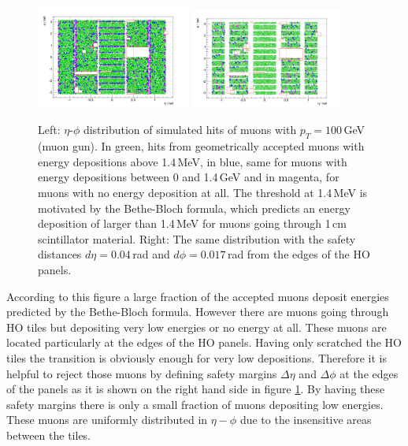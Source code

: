 			\begin{figure}[htbp]
				\centering
				\includegraphics[width=0.45\textwidth]{Figures/erdogan/simhits_wo_deta_dphi.png}
				\includegraphics[width=0.45\textwidth]{Figures/erdogan/simhits_with_deta_dphi.png}
				\caption{Left: $\eta$-$\phi$ distribution of simulated hits of muons with $p_T = 100$\,GeV (muon gun). In green, hits from geometrically accepted muons with energy depositions above 1.4\,MeV, in
				blue, same for muons with energy depositions between 0 and 1.4\,GeV and in magenta, for muons with no energy deposition at all. The threshold at 1.4\,MeV is motivated by the Bethe-Bloch formula,
				which predicts an energy deposition of larger than 1.4\,MeV for muons going through 1\,cm scintillator material. Right: The same distribution with the safety distances $d\eta = 0.04$\,rad and
				$d\phi = 0.017$\,rad from the edges of the HO panels.}
				\label{fig:simhits_in_acceptance}
			\end{figure}
			According to this figure a large fraction of the accepted muons deposit energies predicted by the Bethe-Bloch formula.
			However there are muons going through HO tiles but depositing very low energies or no energy at all.
			These muons are located particularly at the edges of the HO panels.
			Having only scratched the HO tiles the transition is obviously enough for very low depositions.
			Therefore it is helpful to reject those muons by defining safety margins $\Delta\eta$ and $\Delta\phi$ at the edges of the panels as it is shown on the right hand side in figure
			\ref{fig:simhits_in_acceptance}.
			By having these safety margins there is only a small fraction of muons depositing low energies.
			These muons are uniformly distributed in $\eta-\phi$ due to the insensitive areas between the tiles.

